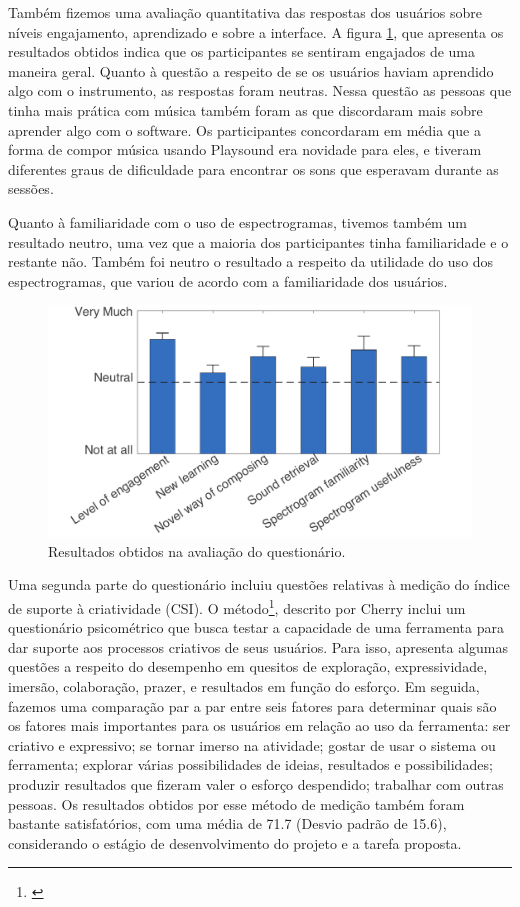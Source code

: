 Também fizemos uma avaliação quantitativa das respostas dos usuários sobre níveis engajamento, aprendizado e sobre a interface. A figura \ref{fig:questionnaire}, que apresenta os resultados obtidos indica que os participantes se sentiram engajados de uma maneira geral. Quanto à questão a respeito de se os usuários haviam aprendido algo com o instrumento, as respostas foram neutras. Nessa questão as pessoas que tinha mais prática com música também foram as que discordaram mais sobre aprender algo com o software. Os participantes concordaram em média que a forma de compor música usando Playsound era novidade para eles, e tiveram diferentes graus de dificuldade para encontrar os sons que esperavam durante as sessões. 

Quanto à familiaridade com o uso de espectrogramas, tivemos também um resultado neutro, uma vez que a maioria dos participantes tinha familiaridade e o restante não. Também foi neutro o resultado a respeito da utilidade do uso dos espectrogramas, que variou de acordo com a familiaridade dos usuários.


\begin{figure}

\includegraphics[width=1\textwidth]{pictures/cap4/questionnaire_lower}
\caption{\label{amas}Resultados obtidos na avaliação do questionário.}
\label{fig:questionnaire}
\end{figure}

Uma segunda parte do questionário incluiu questões relativas à medição do índice de suporte à criatividade (CSI). O método\footnote{\cite{Cherry2014}}, descrito por Cherry inclui um questionário psicométrico que busca testar a capacidade de uma ferramenta para dar suporte aos processos criativos de seus usuários. Para isso, apresenta algumas questões a respeito do desempenho em quesitos de exploração, expressividade, imersão, colaboração, prazer, e resultados em função do esforço. Em seguida, fazemos uma comparação par a par entre seis fatores para determinar quais são os fatores mais importantes para os usuários em relação ao uso da ferramenta: ser criativo e expressivo; se tornar imerso na atividade; gostar de usar o sistema ou ferramenta; explorar várias possibilidades de ideias, resultados e possibilidades; produzir resultados que fizeram valer o esforço despendido; trabalhar com outras pessoas. Os resultados obtidos por esse método de medição também foram bastante satisfatórios, com uma média de 71.7 (Desvio padrão de 15.6), considerando o estágio de desenvolvimento do projeto e a tarefa proposta.


